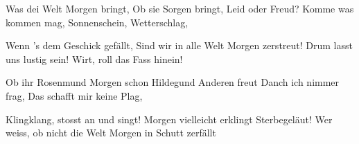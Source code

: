 \footnotemark [
ititle={Heute ist heut}]


\beginverse
Was dei Welt Morgen bringt,
Ob sie Sorgen bringt,
Leid oder Freud?
Komme was kommen mag,
Sonnenschein, Wetterschlag,
\endverse

\beginverse
Wenn 's dem Geschick gefällt,
Sind wir in alle Welt
Morgen zerstreut!
Drum lasst uns lustig sein!
Wirt, roll das Fass hinein!
\endverse

\beginverse
Ob ihr Rosenmund
Morgen schon Hildegund
Anderen freut
Danch ich nimmer frag,
Das schafft mir keine Plag,
\endverse

\beginverse
Klingklang, stosst an und singt!
Morgen vielleicht erklingt
Sterbegeläut!
Wer weiss, ob nicht die Welt
Morgen in Schutt zerfällt
\endverse
\endsong